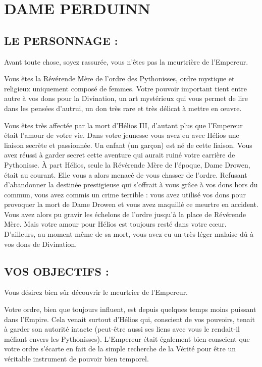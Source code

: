 \documentclass[14pt,twocolumn]{extarticle}
\begin{document}
\section{DAME PERDUINN}

\subsection{LE PERSONNAGE :}

Avant toute chose, soyez rassurée, vous n'êtes pas la meurtrière de l'Empereur.

Vous êtes la Révérende Mère de l'ordre des Pythonisses, ordre mystique et
religieux uniquement composé de femmes. Votre pouvoir important tient entre
autre à vos dons pour la Divination, un art mystérieux qui vous permet de lire
dans les pensées d'autrui, un don très rare et très délicat à mettre en œuvre.

Vous êtes très affectée par la mort d'Hélios III, d'autant plus que l'Empereur
était l'amour de votre vie. Dans votre jeunesse vous avez eu avec Hélios une
liaison secrète et passionnée. Un enfant (un garçon) est né de cette liaison.
Vous avez réussi à garder secret cette aventure qui aurait ruiné votre carrière
de Pythonisse. À part Hélios, seule la Révérende Mère de l'époque, Dame Drowen,
était au courant. Elle vous a alors menacé de vous chasser de l'ordre. Refusant
d'abandonner la destinée prestigieuse qui s'offrait à vous grâce à vos dons
hors du commun, vous avez commis un crime terrible : vous avez utilisé vos dons
pour provoquer la mort de Dame Drowen et vous avez maquillé ce meurtre en
accident. Vous avez alors pu gravir les échelons de l'ordre jusqu'à la place de
Révérende Mère. Mais votre amour pour Hélios est toujours resté dans votre
cœur. D'ailleurs, au moment même de sa mort, vous avez eu un très léger malaise
dû à vos dons de Divination.

\subsection{VOS OBJECTIFS :}

Vous désirez bien sûr découvrir le meurtrier de l'Empereur.

Votre ordre, bien que toujours influent, est depuis quelques temps moins
puissant dans l'Empire. Cela venait surtout d'Hélios qui, conscient de vos
pouvoirs, tenait à garder son autorité intacte (peut-être aussi ses liens avec
vous le rendait-il méfiant envers les Pythonisses). L'Empereur était également
bien conscient que votre ordre s'écarte en fait de la simple recherche de la
Vérité pour être un véritable instrument de pouvoir bien temporel.
\end{document}
